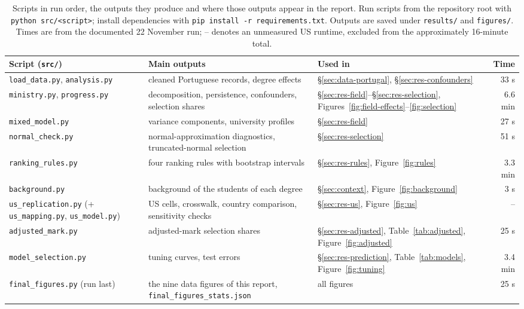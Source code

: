 \begin{table}[t]
\centering
\caption{Scripts in run order, the outputs they produce and where those outputs appear in the report. Run scripts from the repository root with \texttt{python src/<script>}; install dependencies with \texttt{pip install -r requirements.txt}. Outputs are saved under \texttt{results/} and \texttt{figures/}. Times are from the documented 22 November run; -- denotes an unmeasured US runtime, excluded from the approximately 16-minute total.}
\label{tab:pipeline}
\footnotesize
\begin{tabularx}{\textwidth}{@{}l>{\raggedright\arraybackslash}X>{\raggedright\arraybackslash}Xr@{}}
\toprule
Script (\texttt{src/}) & Main outputs & Used in & Time \\
\midrule
\texttt{load\_data.py}, \texttt{analysis.py} & cleaned Portuguese records, degree effects & \S\ref{sec:data-portugal}, \S\ref{sec:res-confounders} & 33 s \\
\texttt{ministry.py}, \texttt{progress.py} & decomposition, persistence, confounders, selection shares & \S\ref{sec:res-field}--\S\ref{sec:res-selection}, Figures~\ref{fig:field-effects}--\ref{fig:selection} & 6.6 min \\
\texttt{mixed\_model.py} & variance components, university profiles & \S\ref{sec:res-field} & 27 s \\
\texttt{normal\_check.py} & normal-approximation diagnostics, truncated-normal selection & \S\ref{sec:res-selection} & 51 s \\
\texttt{ranking\_rules.py} & four ranking rules with bootstrap intervals & \S\ref{sec:res-rules}, Figure~\ref{fig:rules} & 3.3 min \\
\texttt{background.py} & background of the students of each degree & \S\ref{sec:context}, Figure~\ref{fig:background} & 3 s \\
\texttt{us\_replication.py} (+ \texttt{us\_mapping.py}, \texttt{us\_model.py}) & US cells, crosswalk, country comparison, sensitivity checks & \S\ref{sec:res-us}, Figure~\ref{fig:us} & -- \\
\texttt{adjusted\_mark.py} & adjusted-mark selection shares & \S\ref{sec:res-adjusted}, Table~\ref{tab:adjusted}, Figure~\ref{fig:adjusted} & 25 s \\
\texttt{model\_selection.py} & tuning curves, test errors & \S\ref{sec:res-prediction}, Table~\ref{tab:models}, Figure~\ref{fig:tuning} & 3.4 min \\
\texttt{final\_figures.py} (run last) & the nine data figures of this report, \texttt{final\_figures\_stats.json} & all figures & 25 s \\
\bottomrule
\end{tabularx}
\end{table}
